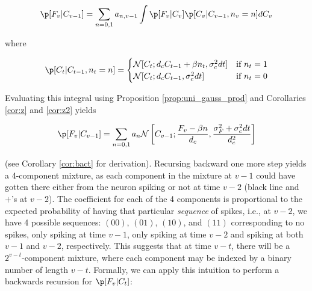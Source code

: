 \begin{align} \label{aeq:mix1}
\p[F_v | C_{v-1}] = \sum_{n=0,1} a_{n,v-1} \int \p[F_v | C_v] \p[C_v | C_{v-1}, n_v=n] dC_v
\end{align}

\noindent where

\begin{align}
\p[C_t | C_{t-1}, n_t=n] =
\begin{cases}
\mathcal{N}[C_t; d_c C_{t-1} + \beta n_t, \sigma_c^2 dt] & \text{if } n_t=1\\
\mathcal{N}[C_t; d_c C_{t-1}, \sigma_c^2 dt] & \text{if } n_t=0
\end{cases}
\end{align}

\noindent Evaluating this integral using Proposition \ref{prop:uni_gauss_prod} and Corollaries \ref{cor:z} and \ref{cor:z2} yields

\begin{align}
\p[F_v | C_{v-1}] = \sum_{n=0,1} a_n \mathcal{N}\left[C_{v-1};\frac{F_v - \beta n}{d_c}, \frac{\sigma_F^2 + \sigma_c^2 dt}{d_c^2}\right]
\end{align}

\noindent (see Corollary \ref{cor:bact} for derivation). Recursing backward one more step yields a 4-component mixture, as each component in the mixture at $v-1$ could have gotten there either from the neuron spiking or not at time $v-2$ (black line and $+$'s at $v-2$).  The coefficient for each of the 4 components is proportional to the expected probability of having that particular \emph{sequence} of spikes, i.e., at $v-2$, we have 4 possible sequences: $(00)$, $(01)$, $(10)$, and $(11)$ corresponding to no spikes, only spiking at time $v-1$, only spiking at time $v-2$ and spiking at both $v-1$ and $v-2$, respectively.  This suggests that at time $v-t$, there will be a $2^{v-t}$-component mixture, where each component may be indexed by a binary number of length $v-t$. %
Formally, we can apply this intuition to perform a backwards recursion for $\p[F_v | C_t]$:

